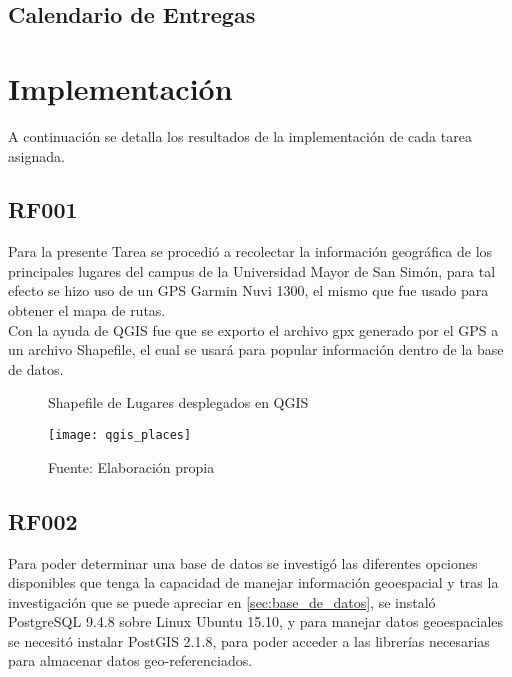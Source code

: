     


  \subsection{Calendario de Entregas}
  \label{subs:schedule_1}

    


\section{Implementación}
\label{sec:implementacion_iteracion_1}

  A continuación se detalla los resultados de la implementación de cada tarea asignada.

\subsection{RF001}
\label{sub:RF001}


Para la presente Tarea se procedió a recolectar la información geográfica de los principales lugares del campus de la Universidad Mayor de San Simón, para tal efecto se hizo uso
de un GPS Garmin Nuvi 1300, el mismo que fue usado  para obtener el mapa de rutas.\\

Con la ayuda de QGIS fue que se exporto el archivo gpx generado por el GPS a un archivo Shapefile, el cual se usará para popular información dentro de la base de datos.\\

\begin{figure}[H]
  \begin{center}
    \caption{Shapefile de Lugares desplegados en QGIS}
    \label{fig:qgis_places}
    \texttt{[image: qgis\_places]}
    \caption*{Fuente: Elaboración propia}
  \end{center}
\end{figure}

\subsection{RF002}
\label{sub:RF002}

Para poder determinar una base de datos se investigó las diferentes opciones disponibles que tenga la capacidad de manejar información geoespacial y tras la investigación que se puede apreciar en \ref{sec:base_de_datos}, se instaló PostgreSQL 9.4.8 sobre Linux Ubuntu 15.10, y para manejar datos geoespaciales se necesitó instalar PostGIS 2.1.8, para poder acceder a las librerías necesarias para almacenar datos geo-referenciados.\\

